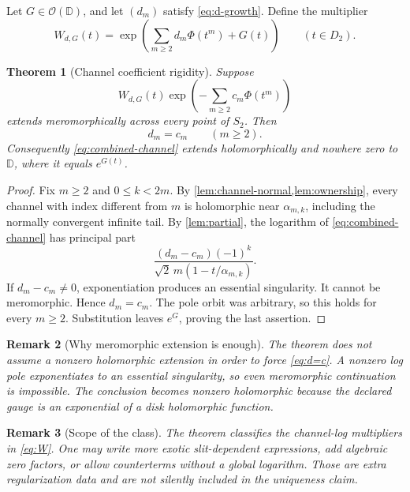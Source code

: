 \documentclass[11pt]{article}
\newtheorem{theorem}{Theorem}[section]
\newtheorem{remark}[theorem]{Remark}
\newcommand{\D}{\mathbb D}
\newcommand{\Ohol}{\mathcal O}
\begin{document}
Let \(G\in\Ohol(\D)\), and let \((d_m)\) satisfy
\cref{eq:d-growth}.  Define the multiplier
\begin{equation}\label{eq:W}
 W_{d,G}(t)=\exp\!\left(\sum_{m\ge2}d_m\Phi(t^m)+G(t)\right)
 \qquad(t\in D_2).
\end{equation}

\begin{theorem}[Channel coefficient rigidity]\label{thm:rigidity}
Suppose
\begin{equation}\label{eq:combined-channel}
 W_{d,G}(t)\exp\!\left(-\sum_{m\ge2}c_m\Phi(t^m)\right)
\end{equation}
extends meromorphically across every point of \(S_2\).  Then
\begin{equation}\label{eq:d=c}
 d_m=c_m\qquad(m\ge2).
\end{equation}
Consequently \cref{eq:combined-channel} extends holomorphically and nowhere
zero to \(\D\), where it equals \(e^{G(t)}\).
\end{theorem}

\begin{proof}
Fix \(m\ge2\) and \(0\le k<2m\).  By
\cref{lem:channel-normal,lem:ownership}, every channel with index different
from \(m\) is holomorphic near \(\alpha_{m,k}\), including the normally
convergent infinite tail.  By \cref{lem:partial}, the logarithm of
\cref{eq:combined-channel} has principal part
\begin{equation}\label{eq:rigidity-principal}
 \frac{(d_m-c_m)(-1)^k}
 {\sqrt2\,m(1-t/\alpha_{m,k})}.
\end{equation}
If \(d_m-c_m\ne0\), exponentiation produces an essential singularity.  It
cannot be meromorphic.  Hence \(d_m=c_m\).  The pole orbit was arbitrary,
so this holds for every \(m\ge2\).  Substitution leaves \(e^G\), proving the
last assertion.
\end{proof}

\begin{remark}[Why meromorphic extension is enough]
The theorem does not assume a nonzero holomorphic extension in order to force
\cref{eq:d=c}.  A nonzero log pole exponentiates to an essential singularity,
so even meromorphic continuation is impossible.  The conclusion becomes
nonzero holomorphic because the declared gauge is an exponential of a disk
holomorphic function.
\end{remark}

\begin{remark}[Scope of the class]
The theorem classifies the channel-log multipliers in \cref{eq:W}.  One may
write more exotic slit-dependent expressions, add algebraic zero factors, or
allow counterterms without a global logarithm.  Those are extra
regularization data and are not silently included in the uniqueness claim.
\end{remark}
\end{document}
